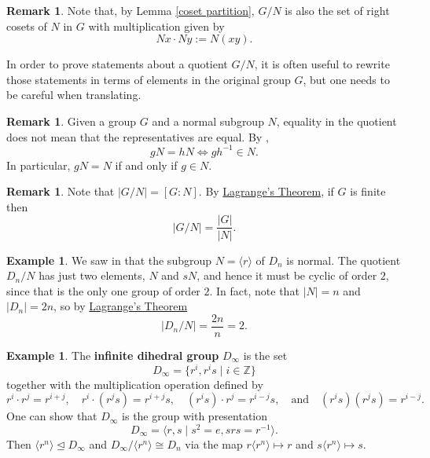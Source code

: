 \documentclass[12pt]{report}
\numberwithin{equation}{section}
\numberwithin{theorem}{chapter}
\theoremstyle{definition}
\newtheorem{example}[theorem]{Example}
\newtheorem*{basic properties}{Basic Properties}
\newtheorem*{Important Remark}{Important Remark}
\newtheorem{remark}[theorem]{Remark}
\newcommand{\df}[1]{{\bf #1}\index{#1}}
\begin{document}
\begin{remark}
	Note that, by  Lemma \ref{coset partition}, $G/N$ is also the set of right  cosets of $N$ in $G$ with multiplication given by 
	$$Nx\cdot Ny := N(xy).$$
\end{remark}


In order to prove statements about a quotient $G/N$, it is often useful to rewrite those statements in terms of elements in the original group $G$, but one needs to be careful when translating.

\begin{remark}
	Given a group $G$ and a normal subgroup $N$, equality in the quotient does not mean that the representatives are equal. By , 
	$$gN = hN \iff gh^{-1} \in N.$$ 
	In particular, $gN = N$ if and only if $g \in N$.
\end{remark}





\begin{remark}\label{order of quotient}
Note that $|G/N| = [G :N ]$. By \hyperref[Lagrange]{Lagrange's Theorem}, if $G$ is finite then
$$\left | G/N\right | = \frac{|G|}{|N|}.$$
\end{remark}




\begin{example}\label{example quotient of D_n by rotations}
We saw in  that the subgroup $N = \langle r \rangle$ of $D_{n}$ is normal. The quotient $D_{n}/N$ has just two elements, $N$ and $sN$, and hence it must be cyclic of order $2$, since that is the only one group of order $2$. In fact, note that $|N| = n$ and $|D_n| = 2n$, so by \hyperref[Lagrange]{Lagrange's Theorem} 
$$|D_n/N| = \frac{2n}{n} =2.$$
\end{example}




\begin{example}\label{example D_infty}
	The \df{infinite dihedral group} $D_\infty$ is the set 
	$$D_\infty = \{r^i,r^is \mid i \in \mathbb{Z}\}$$ 
	together with the multiplication operation defined by 
	$$r^i \cdot r^j = r^{i+j}, \quad r^i \cdot (r^js) = r^{i+j}s, \quad (r^is) \cdot r^j = r^{i-j}s, \quad \textrm{and} \quad (r^is)(r^js) = r^{i-j}.$$
One can show that $D_\infty$ is the group with presentation
$$D_\infty=\langle r,s \mid s^2=e, srs=r^{-1}\rangle.$$
Then $\langle r^n \rangle \trianglelefteq D_\infty$ and $D_\infty/ \langle r^n \rangle \cong D_{n}$ via the map $r\langle r^n \rangle\mapsto r$ and $s\langle r^n \rangle\mapsto s$.
\end{example}
\end{document}
